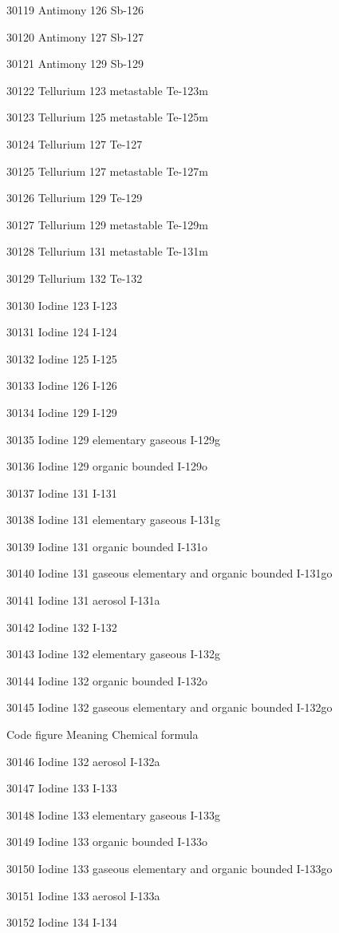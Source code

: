 30119 Antimony 126 Sb-126

30120 Antimony 127 Sb-127

30121 Antimony 129 Sb-129

30122 Tellurium 123 metastable Te-123m

30123 Tellurium 125 metastable Te-125m

30124 Tellurium 127 Te-127

30125 Tellurium 127 metastable Te-127m

30126 Tellurium 129 Te-129

30127 Tellurium 129 metastable Te-129m

30128 Tellurium 131 metastable Te-131m

30129 Tellurium 132 Te-132

30130 Iodine 123 I-123

30131 Iodine 124 I-124

30132 Iodine 125 I-125

30133 Iodine 126 I-126

30134 Iodine 129 I-129

30135 Iodine 129 elementary gaseous I-129g

30136 Iodine 129 organic bounded I-129o

30137 Iodine 131 I-131

30138 Iodine 131 elementary gaseous I-131g

30139 Iodine 131 organic bounded I-131o

30140 Iodine 131 gaseous elementary and organic bounded I-131go

30141 Iodine 131 aerosol I-131a

30142 Iodine 132 I-132

30143 Iodine 132 elementary gaseous I-132g

30144 Iodine 132 organic bounded I-132o

30145 Iodine 132 gaseous elementary and organic bounded I-132go

Code figure Meaning Chemical formula

30146 Iodine 132 aerosol I-132a

30147 Iodine 133 I-133

30148 Iodine 133 elementary gaseous I-133g

30149 Iodine 133 organic bounded I-133o

30150 Iodine 133 gaseous elementary and organic bounded I-133go

30151 Iodine 133 aerosol I-133a

30152 Iodine 134 I-134


